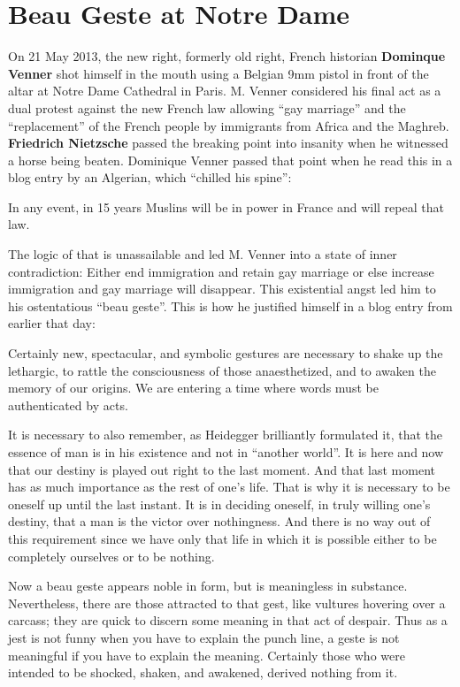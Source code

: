 \section{Beau Geste at Notre Dame}

On 21 May 2013, the new right, formerly old right, French historian \textbf{Dominque Venner} shot himself in the mouth using a Belgian 9mm pistol in front of the altar at Notre Dame Cathedral in Paris. M. Venner considered his final act as a dual protest against the new French law allowing ``gay marriage'' and the ``replacement'' of the French people by immigrants from Africa and the Maghreb. \textbf{Friedrich Nietzsche} passed the breaking point into insanity when he witnessed a horse being beaten. Dominique Venner passed that point when he read this in a blog entry by an Algerian, which ``chilled his spine'':

\begin{quotex}
In any event, in 15 years Muslins will be in power in France and will repeal that law.
\end{quotex}


The logic of that is unassailable and led M. Venner into a state of inner contradiction: Either end immigration and retain gay marriage or else increase immigration and gay marriage will disappear. This existential angst led him to his ostentatious ``beau geste''. This is how he justified himself in a blog entry from earlier that day:

\begin{quotationx}
Certainly new, spectacular, and symbolic gestures are necessary to shake up the lethargic, to rattle the consciousness of those anaesthetized, and to awaken the memory of our origins. We are entering a time where words must be authenticated by acts.

It is necessary to also remember, as Heidegger brilliantly formulated it, that the essence of man is in his existence and not in ``another world''. It is here and now that our destiny is played out right to the last moment. And that last moment has as much importance as the rest of one's life. That is why it is necessary to be oneself up until the last instant. It is in deciding oneself, in truly willing one's destiny, that a man is the victor over nothingness. And there is no way out of this requirement since we have only that life in which it is possible either to be completely ourselves or to be nothing.
\end{quotationx}


Now a beau geste appears noble in form, but is meaningless in substance. Nevertheless, there are those attracted to that gest, like vultures hovering over a carcass; they are quick to discern some meaning in that act of despair. Thus as a jest is not funny when you have to explain the punch line, a geste is not meaningful if you have to explain the meaning. Certainly those who were intended to be shocked, shaken, and awakened, derived nothing from it.

